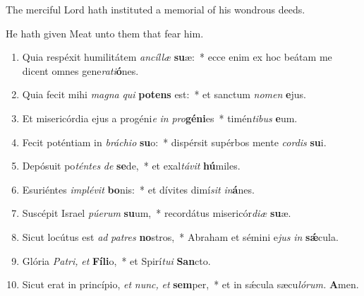 \documentclass[12pt]{book}
\begin{document}


\begin{enpars} \noindent \vv The merciful Lord hath instituted a memorial of his wondrous deeds.

\noindent \rr  He hath given Meat unto them that fear him. \end{enpars}
 
 \myrule
 


 \label{ad_jesum_autem}
 
 

\begin{enumerate}[label=\arabic*.,%
			leftmargin=0pt, %
			itemindent=0mm, %
			labelsep=3pt, %
			labelwidth=0pt, %
			rightmargin=0pt, %
			parsep=0pt, %
			topsep=0pt, %
			itemsep=0pt,%
			start=3]

\item Quia respéxit humilitátem \textit{ancíllæ} \textbf{su}æ:~* ecce enim ex hoc beátam me dicent omnes gene\textit{rati}\textbf{ó}nes.
\item Quia fecit mihi \textit{magna} \textit{qui} \textbf{pot}\textbf{ens} est:~* et sanctum \textit{nomen} \textbf{e}jus.
\item Et misericórdia ejus a progéni\textit{e} \textit{in} \textit{pro}\textbf{gé}\textbf{ni}es~* timén\textit{tibus} \textbf{e}um.
\item Fecit poténtiam in \textit{bráchio} \textbf{su}o:~* dispérsit supérbos mente \textit{cordis} \textbf{su}i.
\item Depósuit po\textit{téntes} \textit{de} \textbf{se}de,~* et exal\textit{távit} \textbf{hú}miles.
\item Esuriéntes \textit{implévit} \textbf{bo}nis:~* et dívites dimí\tinyhspace\textit{sit} \textit{in}\textbf{á}nes.
\item Suscépit Israel \textit{púerum} \textbf{su}um,~* recordátus misericór\textit{diæ} \textbf{su}æ.
\item Sicut locútus est \textit{ad} \textit{pa}\textit{tres} \textbf{no}stros,~* Abraham et sémini e\tinyhspace\textit{jus} \textit{in} \textbf{sǽ}cula.
\item Glória \textit{Pa}\textit{tri,} \textit{et} \textbf{Fí}\textbf{li}o,~* et Spirí\tinyhspace\textit{tui} \textbf{San}cto.
\item Sicut erat in princípio, \textit{et} \textit{nunc,} \textit{et} \textbf{sem}per,~* et in sǽcula sæcu\tinyhspace\textit{lórum.} \textbf{A}men.


\end{enumerate}
    
\end{document}
